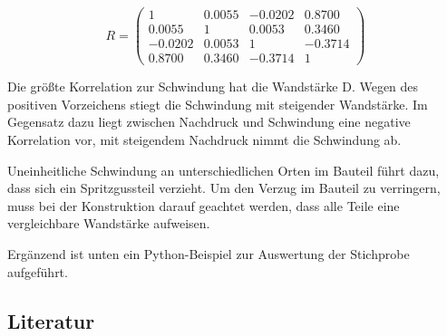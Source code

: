 \begin{equation}\label{eq:seventhirty}
R=\left(\begin{array}{cccc} {1} & {0.0055} & {-0.0202} & {0.8700} \\ 
{0.0055} & {1} & {0.0053} & {0.3460} \\ 
{-0.0202} & {0.0053} & {1} & {-0.3714} \\ 
{0.8700} & {0.3460} & {-0.3714} & {1} \end{array}\right)
\end{equation}

\noindent Die gr\"{o}{\ss}te Korrelation zur Schwindung hat die Wandst\"{a}rke D. Wegen des positiven Vorzeichens stiegt die Schwindung mit steigender Wandst\"{a}rke. Im Gegensatz dazu liegt zwischen Nachdruck und Schwindung eine negative Korrelation vor, mit steigendem Nachdruck nimmt die Schwindung ab.\newline

\noindent Uneinheitliche Schwindung an unterschiedlichen Orten im Bauteil f\"{u}hrt dazu, dass sich ein Spritzgussteil verzieht. Um den Verzug im Bauteil zu verringern, muss bei der Konstruktion darauf geachtet werden, dass alle Teile eine vergleichbare Wandst\"{a}rke aufweisen.\newline

\noindent Erg\"{a}nzend ist unten ein Python-Beispiel zur Auswertung der Stichprobe aufgef\"{u}hrt.



\subsection{Literatur}

